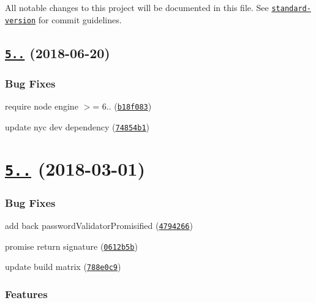 All notable changes to this project will be documented in this file. See \href{https://github.com/conventional-changelog/standard-version}{\tt standard-\/version} for commit guidelines.

\label{_5.0.1}%
 \subsection*{\href{https://github.com/saintedlama/passport-local-mongoose/compare/v5.0.0...v5.0.1}{\tt 5..} (2018-\/06-\/20)}

\subsubsection*{Bug Fixes}


\begin{DoxyItemize}
\item require node engine $>$= 6.. (\href{https://github.com/saintedlama/passport-local-mongoose/commit/b18f083}{\tt b18f083})
\item update nyc dev dependency (\href{https://github.com/saintedlama/passport-local-mongoose/commit/74854b1}{\tt 74854b1})
\end{DoxyItemize}

\label{_5.0.0}%
 \section*{\href{https://github.com/saintedlama/passport-local-mongoose/compare/v4.5.0...v5.0.0}{\tt 5..} (2018-\/03-\/01)}

\subsubsection*{Bug Fixes}


\begin{DoxyItemize}
\item add back password\+Validator\+Promisified (\href{https://github.com/saintedlama/passport-local-mongoose/commit/4794266}{\tt 4794266})
\item promise return signature (\href{https://github.com/saintedlama/passport-local-mongoose/commit/0612b5b}{\tt 0612b5b})
\item update build matrix (\href{https://github.com/saintedlama/passport-local-mongoose/commit/788e0c9}{\tt 788e0c9})
\end{DoxyItemize}

\subsubsection*{Features}


